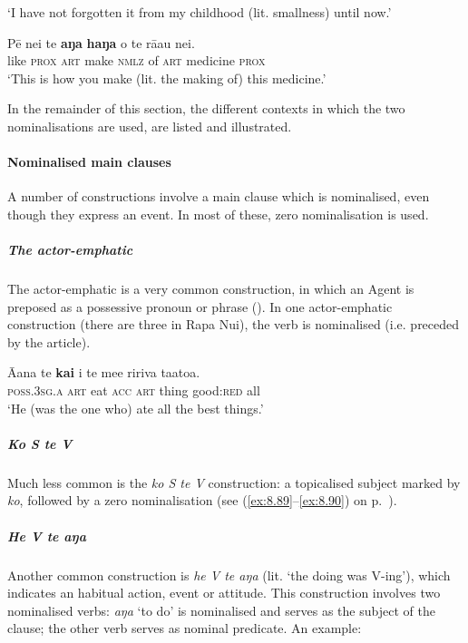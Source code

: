 \glt 
‘I have not forgotten it from my childhood (lit. smallness) until now.’ \textstyleExampleref{[R416.936]} 
\z

\ea\label{ex:3.21}
\gll Pē nei te \textbf{aŋa} \textbf{haŋa} o te rā{\ꞌ}au nei.\\
like \textsc{prox} \textsc{art} make \textsc{nmlz} of \textsc{art} medicine \textsc{prox}\\

\glt 
‘This is how you make (lit. the making of) this medicine.’ \textstyleExampleref{[R313.159]} 
\z

In the remainder of this section, the different contexts in which the two nominalisations are used, are listed and illustrated.

\paragraph{Nominalised main clauses}\label{sec:3.2.3.1.1} A number of constructions involve a main clause which is nominalised, even though they express an event. In most of these, zero nominalisation is used.

\subparagraph{The actor-emphatic} The actor-emphatic is a very common construction, in which an Agent is preposed as a possessive pronoun or phrase (). In one actor-emphatic construction (there are three in Rapa Nui), the verb is nominalised (i.e. preceded by the article). 

\ea\label{ex:3.22}
\gll {\ꞌ}Ā{\ꞌ}ana te \textbf{kai} i te me{\ꞌ}e ririva ta{\ꞌ}ato{\ꞌ}a. \\
\textsc{poss.3sg.a} \textsc{art} eat \textsc{acc} \textsc{art} thing good:\textsc{red} all \\

\glt
‘He (was the one who) ate all the best things.’ \textstyleExampleref{[R532-01.011]}
\z

\subparagraph{\textit{Ko S te V}} Much less common is the \textit{ko S te V} construction: a topicalised subject marked by \textit{ko}, followed by a zero nominalisation (see (\ref{ex:8.89}–\ref{ex:8.90}) on p.~\pageref{ex:8.89}).

\subparagraph{\textit{He V te aŋa}} Another common construction is \textit{he V te aŋa} (lit. ‘the doing was V-ing’), which indicates an habitual action, event or attitude. This construction involves two nominalised verbs: \textit{aŋa} ‘to do’ is nominalised and serves as the subject of the clause; the other verb serves as nominal predicate. An example:

